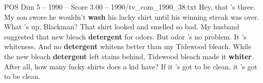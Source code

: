 \begin{textsample}{POS Dim 5 – 1990 – Score 3.00 – 1990/tv\_com\_1990\_38.txt}  \label{ex:f5_pos_022}
Hey, that 's three.
My son swore he wouldn't \textbf{wash} his lucky shirt until his winning streak was over.
What 's up, Blackman?
That shirt looked and smelled so bad.
My husband suggested that new bleach \textbf{detergent} for odors.
But odor 's no problem.
It 's whiteness.
And no \textbf{detergent} whitens better than my Tidewood bleach.
While the new bleach \textbf{detergent} left stains behind, Tidewood bleach made it \textbf{whiter}.
After all, how many lucky shirts does a kid have?
If it 's got to be clean, it 's got to be clean.

\end{textsample}
